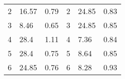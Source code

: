 \documentclass[oneside,onecolumn]{article}
\begin{document}
\begin{table}[]
\begin{tabular}{llllll}
2                                                                                   & 16.57                                                                                                   & 0.79                                                                                   & 2                                                                                    & 24.85                                                                                                   & 0.83                                                                                   \\
3                                                                                   & 8.46                                                                                                    & 0.65                                                                                   & 3                                                                                    & 24.85                                                                                                   & 0.85                                                                                   \\
4                                                                                   & 28.4                                                                                                    & 1.11                                                                                   & 4                                                                                    & 7.36                                                                                                    & 0.84                                                                                   \\
5                                                                                   & 28.4                                                                                                    & 0.75                                                                                   & 5                                                                                    & 8.64                                                                                                    & 0.85                                                                                   \\
6                                                                                   & 24.85                                                                                                   & 0.76                                                                                   & 6                                                                                    & 8.28                                                                                                    & 0.93                                                                                   \\

\end{tabular}
\end{table}
\end{document}
